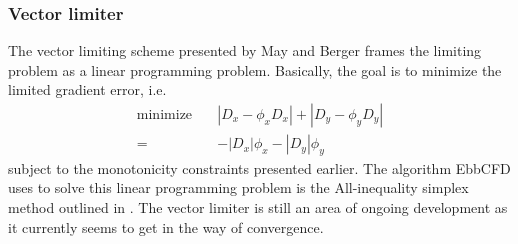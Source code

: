 \documentclass[12pt,parskip=full]{article}
\numberwithin{subsection}{section}
\begin{document}
			\subsubsection{Vector limiter}
				The vector limiting scheme presented by May and Berger frames the limiting problem as a linear programming problem.
				Basically, the goal is to minimize the limited gradient error, i.e.
				\begin{align}
					\mathrm{minimize}\quad &|D_x - \phi_x D_x| + |D_y - \phi_y D_y| \\
									=& -|D_x|\phi_x - |D_y|\phi_y
				\end{align}
				subject to the monotonicity constraints presented earlier. The algorithm EbbCFD uses to solve this linear
				programming problem is the All-inequality simplex method outlined in \cite{doi:10.1137/120875624}. The vector
				limiter is still an area of ongoing development as it currently seems to get in the way of convergence.
\end{document}
